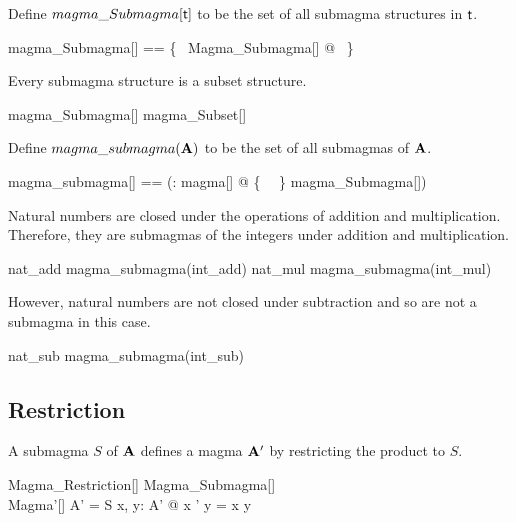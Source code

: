 \documentclass{amsart}
\begin{document}
Define $magma\_Submagma[\mathsf{t}]$ to be the set of all submagma structures in $\mathsf{t}$.

\begin{zed}
	magma\_Submagma[\genT] == \{~ Magma\_Submagma[\genT] @ \strucS ~\}
\end{zed}

\begin{remark}
Every submagma structure is a subset structure.

\begin{zed}
	magma\_Submagma[\setT] \subseteq magma\_Subset[\setT]
\end{zed}

\end{remark}

Define $magma\_submagma(\mathbf{A})$ to be the set of all submagmas of $\mathbf{A}$.

\begin{zed}
	magma\_submagma[\genT] == (\lambda \strucA: magma[\genT] @ \{~ \strucA ~\} \dres magma\_Submagma[\genT])
\end{zed}

\begin{example}
Natural numbers are closed under the operations of addition and multiplication.
Therefore, they are submagmas of the integers under addition and multiplication.

\begin{zed}
	nat\_add \in magma\_submagma(int\_add)
\also
	nat\_mul \in magma\_submagma(int\_mul)
\end{zed}

However, natural numbers are not closed under subtraction and so are not
a submagma in this case.

\begin{zed}
	nat\_sub \notin magma\_submagma(int\_sub)
\end{zed}

\end{example}

\subsection{Restriction}

A submagma $S$ of $\mathbf{A}$ defines a magma $\mathbf{A}'$ by restricting the
product to $S$.

\begin{schema}{Magma\_Restriction}[\genT]
	Magma\_Submagma[\genT] \\
	Magma'[\genT]
\where
	A' = S
\also
	\forall x, y: A' @ x \opG' y = x \opG y
\end{schema}
\end{document}

